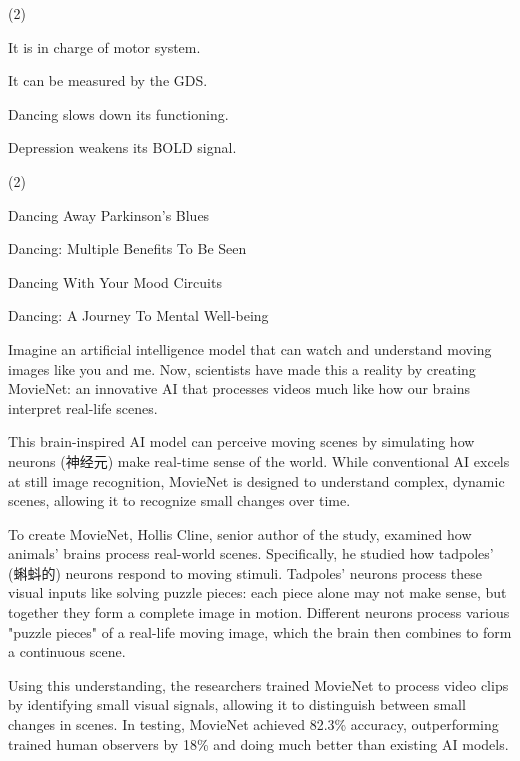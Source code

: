 \documentclass{英语试卷}
\begin{document}
\begin{choices}(2)
  \item It is in charge of motor system.
  \item It can be measured by the GDS.
  \item Dancing slows down its functioning.
  \item Depression weakens its BOLD signal.
\end{choices}
\begin{choices}(2)
  \item Dancing Away Parkinson's Blues
  \item Dancing: Multiple Benefits To Be Seen
  \item Dancing With Your Mood Circuits
  \item Dancing: A Journey To Mental Well-being
\end{choices}
\par Imagine an artificial intelligence model that can watch and understand moving images like you and me. Now, scientists have made this a reality by creating MovieNet: an innovative AI that processes videos much like how our brains interpret real-life scenes.\par
\par This brain-inspired AI model can perceive moving scenes by simulating how neurons (神经元) make real-time sense of the world. While conventional AI excels at still image recognition, MovieNet is designed to understand complex, dynamic scenes, allowing it to recognize small changes over time.\par
\par To create MovieNet, Hollis Cline, senior author of the study, examined how animals' brains process real-world scenes. Specifically, he studied how tadpoles' (蝌蚪的) neurons respond to moving stimuli. Tadpoles' neurons process these visual inputs like solving puzzle pieces: each piece alone may not make sense, but together they form a complete image in motion. Different neurons process various "puzzle pieces" of a real-life moving image, which the brain then combines to form a continuous scene.\par
\par Using this understanding, the researchers trained MovieNet to process video clips by identifying small visual signals, allowing it to distinguish between small changes in scenes. In testing, MovieNet achieved 82.3\% accuracy, outperforming trained human observers by 18\% and doing much better than existing AI models.\par
\end{document}
